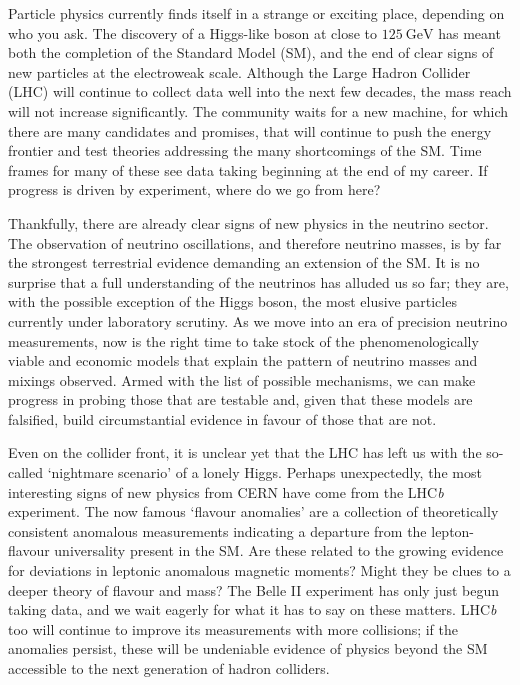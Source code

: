 \begin{preface}
  Particle physics currently finds itself in a strange or exciting place,
  depending on who you ask. The discovery of a Higgs-like boson at close to
  $\SI{125}{\GeV}$ has meant both the completion of the Standard Model (SM), and
  the end of clear signs of new particles at the electroweak scale. Although the
  Large Hadron Collider (LHC) will continue to collect data well into the next
  few decades, the mass reach will not increase significantly. The community
  waits for a new machine, for which there are many candidates and promises,
  that will continue to push the energy frontier and test theories addressing
  the many shortcomings of the SM. Time frames for many of these see data taking
  beginning at the end of my career. If progress is driven by experiment, where
  do we go from here?

  Thankfully, there are already clear signs of new physics in the neutrino
  sector. The observation of neutrino oscillations, and therefore neutrino
  masses, is by far the strongest terrestrial evidence demanding an extension of
  the SM. It is no surprise that a full understanding of the neutrinos has
  alluded us so far; they are, with the possible exception of the Higgs boson,
  the most elusive particles currently under laboratory scrutiny. As we move
  into an era of precision neutrino measurements, now is the right time to take
  stock of the phenomenologically viable and economic models that explain the
  pattern of neutrino masses and mixings observed. Armed with the list of
  possible mechanisms, we can make progress in probing those that are testable
  and, given that these models are falsified, build circumstantial evidence in
  favour of those that are not.

  Even on the collider front, it is unclear yet that the LHC has left us with
  the so-called `nightmare scenario' of a lonely Higgs. Perhaps unexpectedly,
  the most interesting signs of new physics from CERN have come from the
  LHC\textit{b} experiment. The now famous `flavour anomalies' are a collection
  of theoretically consistent anomalous measurements indicating a departure from
  the lepton-flavour universality present in the SM. Are these related to the
  growing evidence for deviations in leptonic anomalous magnetic moments? Might
  they be clues to a deeper theory of flavour and mass? The Belle II experiment
  has only just begun taking data, and we wait eagerly for what it has to say on
  these matters. LHC\textit{b} too will continue to improve its measurements
  with more collisions; if the anomalies persist, these will be undeniable
  evidence of physics beyond the SM accessible to the next generation of hadron
  colliders.


\end{preface}
